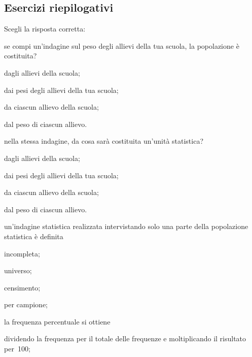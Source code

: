 \subsection{Esercizi riepilogativi}
\begin{esercizio}
\label{ese:A.39}
Scegli la risposta corretta:
\begin{enumerate*}
 \item se compi un'indagine sul peso degli allievi della tua scuola, la 
popolazione è costituita?
\begin{multicols}{2} \begin{enumeratea} 
 \item dagli allievi della scuola;
\item dai pesi degli allievi della tua scuola;
\item da ciascun allievo della scuola;
\item dal peso di ciascun allievo.
 \end{enumeratea} \end{multicols}
 \item nella stessa indagine, da cosa sarà costituita un'unità statistica?
\begin{multicols}{2} \begin{enumeratea}
 \item dagli allievi della scuola;
\item dai pesi degli allievi della tua scuola;
\item da ciascun allievo della scuola;
\item dal peso di ciascun allievo.
 \end{enumeratea} \end{multicols}
\item un'indagine statistica realizzata intervistando solo una parte della 
popolazione statistica è definita
\begin{multicols}{4} \begin{enumeratea}
 \item incompleta;
\item universo;
\item censimento;
\item per campione;
 \end{enumeratea} \end{multicols}
\item la frequenza percentuale si ottiene
 \begin{enumeratea}
\item dividendo la frequenza per il totale delle frequenze e moltiplicando 
il risultato per~100;

\end{enumeratea}
\end{enumerate*}
\end{esercizio}
